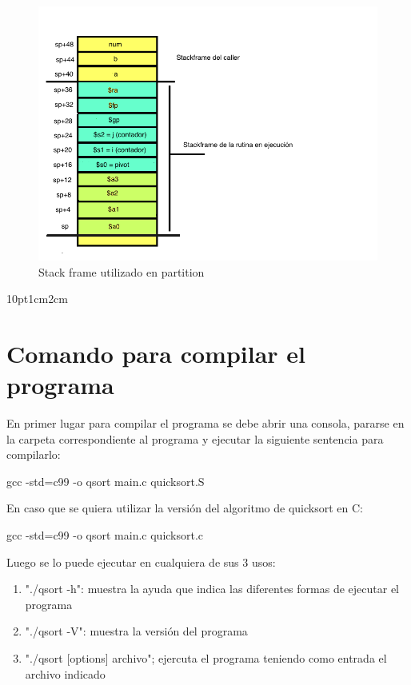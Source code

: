 \documentclass[a4paper,10pt]{article}
\numberwithin{equation}{section}
\numberwithin{figure}{section}
\begin{document}
\begin{figure}[h]
  \centering
    \includegraphics[width=1\textwidth]{partition_stack.png}
  \caption{Stack frame utilizado en partition}
  \label{fig:stack}
\end{figure}

\setmargins{4.5cm}{1.5cm}{13.5cm}{23.42cm} {10pt}{1cm}{2cm}    

\section{Comando para compilar el programa} 

En primer lugar para compilar el programa se debe abrir una consola, pararse en la carpeta correspondiente al programa y ejecutar la siguiente sentencia para compilarlo:

\begin{center}
gcc -std=c99 -o qsort main.c quicksort.S
\end{center}

En caso que se quiera utilizar la versión del algoritmo de quicksort en C:

\begin{center}
gcc -std=c99 -o qsort main.c quicksort.c
\end{center}


Luego se lo puede ejecutar en cualquiera de sus 3 usos:

\begin{enumerate}
	\item "./qsort -h": muestra la ayuda que indica las diferentes formas de ejecutar el programa 
	\item "./qsort -V": muestra la versión del programa
	\item "./qsort [options] archivo"; ejercuta el programa teniendo como entrada el archivo indicado
\end{enumerate}
\end{document}
